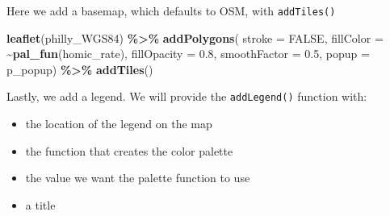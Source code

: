 \documentclass[
]{book}
\newenvironment{Shaded}{\begin{snugshade}}{\end{snugshade}}
\newcommand{\AttributeTok}[1]{\textcolor[rgb]{0.13,0.29,0.53}{#1}}
\newcommand{\CommentTok}[1]{\textcolor[rgb]{0.56,0.35,0.01}{\textit{#1}}}
\newcommand{\ConstantTok}[1]{\textcolor[rgb]{0.56,0.35,0.01}{#1}}
\newcommand{\DecValTok}[1]{\textcolor[rgb]{0.00,0.00,0.81}{#1}}
\newcommand{\FloatTok}[1]{\textcolor[rgb]{0.00,0.00,0.81}{#1}}
\newcommand{\FunctionTok}[1]{\textcolor[rgb]{0.13,0.29,0.53}{\textbf{#1}}}
\newcommand{\NormalTok}[1]{#1}
\newcommand{\OtherTok}[1]{\textcolor[rgb]{0.56,0.35,0.01}{#1}}
\newcommand{\SpecialCharTok}[1]{\textcolor[rgb]{0.81,0.36,0.00}{\textbf{#1}}}
\newcommand{\StringTok}[1]{\textcolor[rgb]{0.31,0.60,0.02}{#1}}
\providecommand{\tightlist}{%
  \setlength{\itemsep}{0pt}\setlength{\parskip}{0pt}}
\begin{document}
\begin{Shaded}
\end{Shaded}

Here we add a basemap, which defaults to OSM, with \texttt{addTiles()}

\begin{Shaded}
\begin{Highlighting}[]
\FunctionTok{leaflet}\NormalTok{(philly\_WGS84) }\SpecialCharTok{\%\textgreater{}\%}
  \FunctionTok{addPolygons}\NormalTok{(}
    \AttributeTok{stroke =} \ConstantTok{FALSE}\NormalTok{, }
    \AttributeTok{fillColor =} \SpecialCharTok{\textasciitilde{}}\FunctionTok{pal\_fun}\NormalTok{(homic\_rate),}
    \AttributeTok{fillOpacity =} \FloatTok{0.8}\NormalTok{, }\AttributeTok{smoothFactor =} \FloatTok{0.5}\NormalTok{,}
    \AttributeTok{popup =}\NormalTok{ p\_popup) }\SpecialCharTok{\%\textgreater{}\%}
  \FunctionTok{addTiles}\NormalTok{()}
\end{Highlighting}
\end{Shaded}

Lastly, we add a legend. We will provide the \texttt{addLegend()} function with:

\begin{itemize}
\tightlist
\item
  the location of the legend on the map\\
\item
  the function that creates the color palette\\
\item
  the value we want the palette function to use\\
\item
  a title
\end{itemize}
\end{document}

